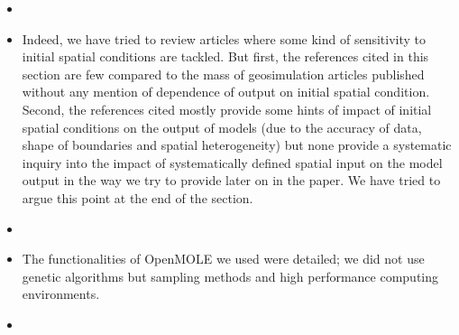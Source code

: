 \documentclass[11pt,a4paper,sans]{moderncv}        %
\begin{document}
\begin{itemize}
	\item {}
	
	\item Indeed, we have tried to review articles where some kind of sensitivity to initial spatial conditions are tackled. But first, the references cited in this section are few compared to the mass of geosimulation articles published without any mention of dependence of output on initial spatial condition. Second, the references cited mostly provide some hints of impact of initial spatial conditions on the output of models (due to the accuracy of data, shape of boundaries and spatial heterogeneity) but none provide a systematic inquiry into the impact of systematically defined spatial input on the model output in the way we try to provide later on in the paper. We have tried to argue this point at the end of the section.
	
	\item
	
	\item The functionalities of OpenMOLE we used were detailed; we did not use genetic algorithms but sampling methods and high performance computing environments.
	
	\item 
	

\end{itemize}
\end{document}
